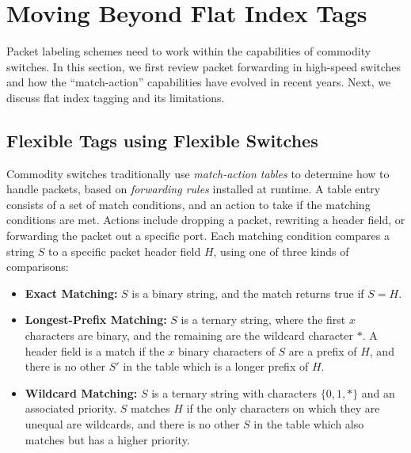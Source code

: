 \section{Moving Beyond Flat Index Tags} \label{sec:background}


Packet labeling schemes need to work within the capabilities of commodity
switches.  In this section, we first review packet forwarding in high-speed
switches and how the ``match-action'' capabilities have evolved in recent years.
Next, we discuss flat index tagging and its limitations. 

\subsection{Flexible Tags using Flexible Switches} Commodity switches
traditionally use \emph{match-action tables} to determine how to handle packets,
based on \textit{forwarding rules} installed at runtime. A table entry consists
of a set of match conditions, and an action to take if the matching conditions
are met. Actions include dropping a packet, rewriting a header field, or
forwarding the packet out a specific port.  Each matching condition compares a
string $S$ to a specific packet header field $H$, using one of three kinds of
comparisons:

\begin{itemize} \item \textbf{Exact Matching:} $S$ is a binary string, and the
match returns true if $S = H$.  \item \textbf{Longest-Prefix Matching:} $S$ is a
ternary string, where the first $x$ characters are binary, and the remaining are
the wildcard character $*$. A header field is a match if the $x$ binary
characters of $S$ are a prefix of $H$, and there is no other $S'$ in the table
which is a longer prefix of $H$.  \item \textbf{Wildcard Matching:} $S$ is a
ternary string with characters $\{0,1,*\}$ and an associated priority. $S$
matches $H$ if the only characters on which they are unequal are wildcards, and
there is no other $S$ in the table which also matches but has a higher priority.
\end{itemize}
  

